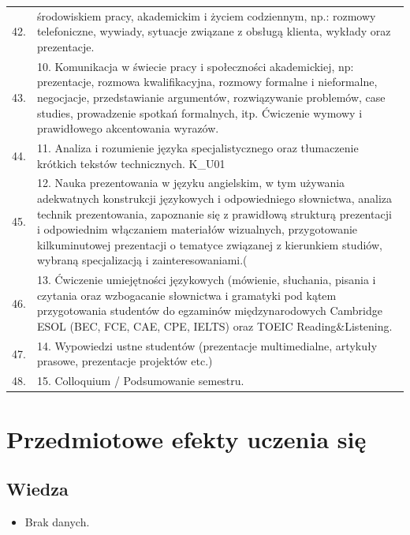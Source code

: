 \documentclass[12pt, a4paper]{article}
\begin{document}
{\begin{longtable}{m{1.5cm}m{14.5cm}}
  \rowcolor{tableRowAlt} 42. & środowiskiem pracy, akademickim i życiem codziennym, np.: rozmowy telefoniczne, wywiady, sytuacje związane z obsługą klienta, wykłady oraz prezentacje. \\
  \rowcolor{tableRowLight} 43. & 10. Komunikacja w świecie pracy i społeczności akademickiej, np: prezentacje, rozmowa kwalifikacyjna, rozmowy formalne i nieformalne, negocjacje, przedstawianie argumentów, rozwiązywanie problemów, case studies, prowadzenie spotkań formalnych, itp. Ćwiczenie wymowy i prawidłowego akcentowania wyrazów. \\
  \rowcolor{tableRowAlt} 44. & 11. Analiza i rozumienie języka specjalistycznego oraz tłumaczenie krótkich tekstów technicznych. K\_U01 \\
  \rowcolor{tableRowLight} 45. & 12. Nauka prezentowania w języku angielskim, w tym używania adekwatnych konstrukcji językowych i odpowiedniego słownictwa, analiza technik prezentowania, zapoznanie się z prawidłową strukturą prezentacji i odpowiednim włączaniem materiałów wizualnych, przygotowanie kilkuminutowej prezentacji o tematyce związanej z kierunkiem studiów, wybraną specjalizacją i zainteresowaniami.( \\
  \rowcolor{tableRowAlt} 46. & 13. Ćwiczenie umiejętności językowych (mówienie, słuchania, pisania i czytania oraz wzbogacanie słownictwa i gramatyki pod kątem przygotowania studentów do egzaminów międzynarodowych Cambridge ESOL (BEC, FCE, CAE, CPE, IELTS) oraz TOEIC Reading\&Listening. \\
  \rowcolor{tableRowLight} 47. & 14. Wypowiedzi ustne studentów (prezentacje multimedialne, artykuły prasowe,  prezentacje projektów etc.) \\
  \rowcolor{tableRowAlt} 48. & 15. Colloquium / Podsumowanie semestru. \\
\bottomrule
\end{longtable}}

\section{Przedmiotowe efekty uczenia się}

\subsection*{Wiedza}
\begin{itemize}
  \item Brak danych.
\end{itemize}
\end{document}
